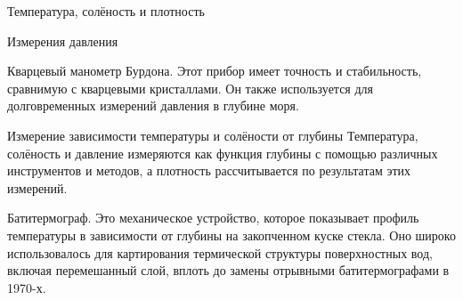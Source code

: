 \begin{chapter}{Температура, солёность и плотность}
\begin{section}{Измерения давления}
\begin{paragraph}{Кварцевый манометр Бурдона.}
Этот прибор имеет точность и стабильность, сравнимую с кварцевыми кристаллами. 
Он также используется для долговременных измерений давления в глубине
моря.
%
\end{paragraph}
\end{section}


\begin{section}{Измерение зависимости температуры и солёности от глубины}
Температура, солёность и давление измеряются как функция глубины с
помощью различных инструментов и методов, а плотность рассчитывается по
результатам этих измерений.
%

\begin{paragraph}{Батитермограф.}
Это механическое устройство, которое показывает профиль температуры 
в зависимости от глубины на закопченном куске стекла. Оно широко
использовалось для картирования термической структуры поверхностных вод, 
включая перемешанный слой, вплоть до замены отрывными батитермографами 
в 1970-х.
%
\end{paragraph}


\end{section}
\end{chapter}
